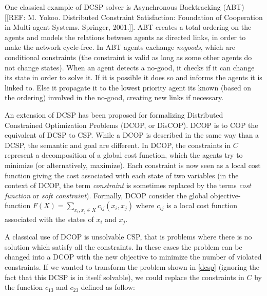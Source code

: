 One classical example of DCSP solver is Asynchronous Backtracking (ABT)[[REF: M. Yokoo. Distributed Constraint Satisfaction: Foundation of Cooperation in Multi-agent Systems. Springer, 2001.]]. ABT creates a total ordering on the agents and models the relations between agents as directed links, in order to make the network cycle-free. In ABT agents exchange \emph{nogoods}, which are conditional constraints (the constraint is valid as long as some other agents do not change states). When an agent detects a no-good, it checks if it can change its state in order to solve it. If it is possible it does so and informs the agents it is linked to. Else it propagate it to the lowest priority agent its known (based on the ordering) involved in the no-good, creating new links if necessary.

An extension of DCSP has been proposed for formalizing Distributed Constrained Optimization Problems (DCOP, or DisCOP). DCOP is to COP the equivalent of DCSP to CSP. While a DCOP is described in the same way than a DCSP, the semantic and goal are different.
In DCOP, the constraints in $C$ represent a decomposition of a global cost function, which the agents try to minimize (or alternatively, maximize). Each constraint is now seen as a local cost function giving the cost associated with each state of two variables (in the context of DCOP, the term \emph{constraint} is sometimes replaced by the terms \emph{cost function} or \emph{soft constraint}). Formally, DCOP consider the global objective-function $F(X) = \displaystyle\sum_{x_i, x_j \in X} c_{ij}(x_i,x_j)$ where $c_{ij}$ is a local cost function associated with the states of $x_i$ and $x_j$.

A classical use of DCOP is unsolvable CSP, that is problems where there is no solution which satisfy all the constraints. In these cases the problem can be changed into a DCOP with the new objective to minimize the number of violated constraints. If we wanted to transform the problem shown in \figurename{} \ref{dcsp} (ignoring the fact that this DCSP is in itself solvable), we could replace the constraints in $C$ by the function $c_{13}$ and $c_{23}$ defined as follow:

